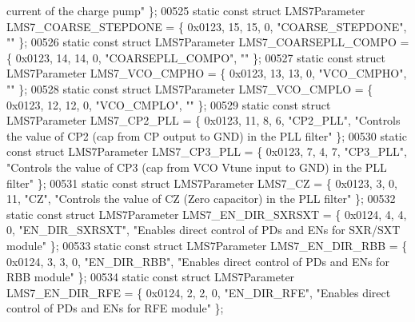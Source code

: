 \begin{DoxyCode}
{       current of the charge pump"} \};
00525 \textcolor{keyword}{static} \textcolor{keyword}{const} \textcolor{keyword}{struct }LMS7Parameter LMS7_COARSE_STEPDONE = \{ 0x0123, 15, 15, 0, \textcolor{stringliteral}{"COARSE\_STEPDONE"}, \textcolor{stringliteral}{""} \};
00526 \textcolor{keyword}{static} \textcolor{keyword}{const} \textcolor{keyword}{struct }LMS7Parameter LMS7_COARSEPLL_COMPO = \{ 0x0123, 14, 14, 0, \textcolor{stringliteral}{"COARSEPLL\_COMPO"}, \textcolor{stringliteral}{""} \};
00527 \textcolor{keyword}{static} \textcolor{keyword}{const} \textcolor{keyword}{struct }LMS7Parameter LMS7_VCO_CMPHO = \{ 0x0123, 13, 13, 0, \textcolor{stringliteral}{"VCO\_CMPHO"}, \textcolor{stringliteral}{""} \};
00528 \textcolor{keyword}{static} \textcolor{keyword}{const} \textcolor{keyword}{struct }LMS7Parameter LMS7_VCO_CMPLO = \{ 0x0123, 12, 12, 0, \textcolor{stringliteral}{"VCO\_CMPLO"}, \textcolor{stringliteral}{""} \};
00529 \textcolor{keyword}{static} \textcolor{keyword}{const} \textcolor{keyword}{struct }LMS7Parameter LMS7_CP2_PLL = \{ 0x0123, 11, 8, 6, \textcolor{stringliteral}{"CP2\_PLL"}, \textcolor{stringliteral}{"Controls the value of CP2
       (cap from CP output to GND) in the PLL filter"} \};
00530 \textcolor{keyword}{static} \textcolor{keyword}{const} \textcolor{keyword}{struct }LMS7Parameter LMS7_CP3_PLL = \{ 0x0123, 7, 4, 7, \textcolor{stringliteral}{"CP3\_PLL"}, \textcolor{stringliteral}{"Controls the value of CP3
       (cap from VCO Vtune input to GND) in the PLL filter"} \};
00531 \textcolor{keyword}{static} \textcolor{keyword}{const} \textcolor{keyword}{struct }LMS7Parameter LMS7_CZ = \{ 0x0123, 3, 0, 11, \textcolor{stringliteral}{"CZ"}, \textcolor{stringliteral}{"Controls the value of CZ (Zero
       capacitor) in the PLL filter"} \};
00532 \textcolor{keyword}{static} \textcolor{keyword}{const} \textcolor{keyword}{struct }LMS7Parameter LMS7_EN_DIR_SXRSXT = \{ 0x0124, 4, 4, 0, \textcolor{stringliteral}{"EN\_DIR\_SXRSXT"}, \textcolor{stringliteral}{"Enables direct
       control of PDs and ENs for SXR/SXT module"} \};
00533 \textcolor{keyword}{static} \textcolor{keyword}{const} \textcolor{keyword}{struct }LMS7Parameter LMS7_EN_DIR_RBB = \{ 0x0124, 3, 3, 0, \textcolor{stringliteral}{"EN\_DIR\_RBB"}, \textcolor{stringliteral}{"Enables direct
       control of PDs and ENs for RBB module"} \};
00534 \textcolor{keyword}{static} \textcolor{keyword}{const} \textcolor{keyword}{struct }LMS7Parameter LMS7_EN_DIR_RFE = \{ 0x0124, 2, 2, 0, \textcolor{stringliteral}{"EN\_DIR\_RFE"}, \textcolor{stringliteral}{"Enables direct
       control of PDs and ENs for RFE module"} \};

\end{DoxyCode}
